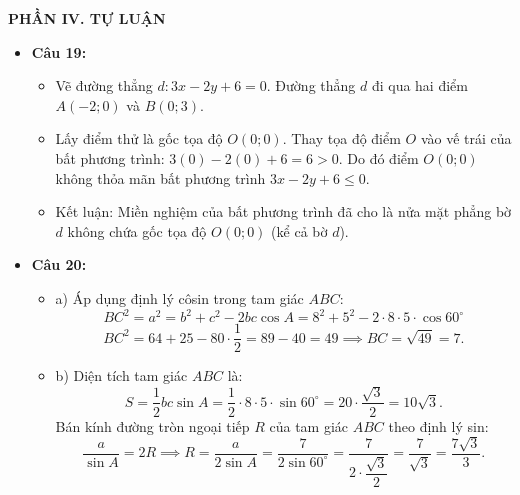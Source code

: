 \documentclass[12pt,a4paper]{article}
\begin{document}
\vspace{0.2cm}
\textbf{PHẦN IV. TỰ LUẬN}
\begin{itemize}[leftmargin=0.6cm]
    \item \textbf{Câu 19:}
    \begin{itemize}
        \item Vẽ đường thẳng $d: 3x - 2y + 6 = 0$.
        Đường thẳng $d$ đi qua hai điểm $A(-2; 0)$ và $B(0; 3)$.
        \item Lấy điểm thử là gốc tọa độ $O(0; 0)$. Thay tọa độ điểm $O$ vào vế trái của bất phương trình:
        $3(0) - 2(0) + 6 = 6 > 0$.
        Do đó điểm $O(0; 0)$ không thỏa mãn bất phương trình $3x - 2y + 6 \le 0$.
        \item Kết luận: Miền nghiệm của bất phương trình đã cho là nửa mặt phẳng bờ $d$ không chứa gốc tọa độ $O(0; 0)$ (kể cả bờ $d$).
    \end{itemize}

\begin{center}
\end{center}

    \item \textbf{Câu 20:}
    \begin{itemize}
        \item a) Áp dụng định lý côsin trong tam giác $ABC$:
        \[ BC^2 = a^2 = b^2 + c^2 - 2bc \cos A = 8^2 + 5^2 - 2 \cdot 8 \cdot 5 \cdot \cos 60^\circ \]
        \[ BC^2 = 64 + 25 - 80 \cdot \dfrac{1}{2} = 89 - 40 = 49 \implies BC = \sqrt{49} = 7. \]
        \item b) Diện tích tam giác $ABC$ là:
        \[ S = \dfrac{1}{2}bc \sin A = \dfrac{1}{2} \cdot 8 \cdot 5 \cdot \sin 60^\circ = 20 \cdot \dfrac{\sqrt{3}}{2} = 10\sqrt{3}. \]
        Bán kính đường tròn ngoại tiếp $R$ của tam giác $ABC$ theo định lý sin:
        \[ \dfrac{a}{\sin A} = 2R \implies R = \dfrac{a}{2\sin A} = \dfrac{7}{2\sin 60^\circ} = \dfrac{7}{2 \cdot \dfrac{\sqrt{3}}{2}} = \dfrac{7}{\sqrt{3}} = \dfrac{7\sqrt{3}}{3}. \]
    \end{itemize}


\end{itemize}
\end{document}
